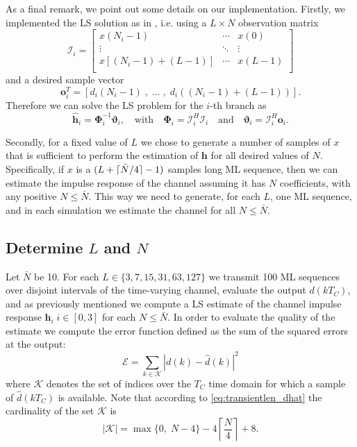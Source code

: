 \documentclass[10pt]{article}
\DeclarePairedDelimiter{\ceil}{\lceil}{\rceil}
\begin{document}
As a final remark, we point out some details on our implementation. Firstly, we implemented the LS solution as in \cite[p.~246]{bc}, i.e. using a $L \times N$ observation matrix
\begin{equation}
	\boldsymbol{\mathcal{I}}_i =
 \begin{bmatrix}
  x(N_i-1) & \cdots & x(0) \\
  \vdots  & \ddots & \vdots  \\
x[(N_i-1)+(L-1)] & \cdots & x(L-1) \\
 \end{bmatrix}
\end{equation}
and a desired sample vector
\begin{equation}
\mathbf{o}_i^T = \left[ d_i(N_i-1)\;,\; \ldots\; , \;d_i((N_i-1)+(L-1)) \right].
\end{equation}
Therefore we can solve the LS problem for the $i$-th branch as
\begin{equation}
	\hat{\mathbf{h}}_i = \mathbf{\Phi}_i^{-1} \boldsymbol{\vartheta}_i, \quad\mathrm{ with } \quad \mathbf{\Phi}_i=\boldsymbol{\mathcal{I}}_i^H \boldsymbol{\mathcal{I}}_i \quad \mathrm{ and }\quad \boldsymbol{\vartheta}_i = \boldsymbol{\mathcal{I}}_i^H \mathbf{o}_i.
\end{equation}

Secondly, for a fixed value of $L$ we chose to generate a number of samples of $x$ that is sufficient to perform the estimation of $\mathbf{h}$ for all desired values of $N$. Specifically, if $x$ is a $(L+\ceil{\bar{N}/4} - 1)$ samples long ML sequence, then we can estimate the impulse response of the channel assuming it has $N$ coefficients, with any positive $N \leq \bar{N}$. This way we need to generate, for each $L$, one ML sequence, and in each simulation we estimate the channel for all $N \leq \bar{N}$.

\subsection*{Determine $L$ and $N$}
Let $\bar{N}$ be 10. For each $L \in \{3, 7, 15, 31, 63, 127\}$ we transmit 100 ML sequences over disjoint intervals of the time-varying channel, evaluate the output $d(kT_C)$, and as previously mentioned we compute a LS estimate of the channel impulse response $\mathbf{h}_i \; i \in [0,3]$ for each $N \leq \bar{N}$. In order to evaluate the quality of the estimate we compute the error function defined as the sum of the squared errors at the output:
\begin{equation}
	\mathcal{E} = \sum_{k \in \mathcal{K}} |d(k)-\hat{d}(k)|^2
\end{equation}
where $\mathcal{K}$ denotes the set of indices over the $T_C$ time domain for which a sample of $\hat{d}(kT_C)$ is available. Note that according to \eqref{eq:transientlen_dhat} the cardinality of the set $\mathcal{K}$ is
\begin{equation}
|\mathcal{K}| = \max \{ 0, \; N-4 \} - 4 \left\lceil \frac{N}{4} \right\rceil + 8.
\end{equation}
\end{document}
